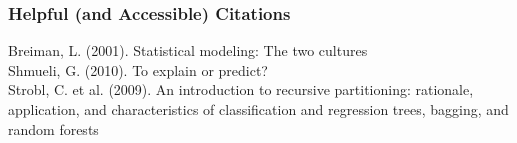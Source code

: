 \documentclass{beamer}\usepackage[]{graphicx}\usepackage[]{color}
\begin{document}

\begin{frame}
\frametitle{Helpful (and Accessible) Citations}

Breiman, L. (2001). Statistical modeling: The two cultures \\

Shmueli, G. (2010). To explain or predict? \\

Strobl, C. et al. (2009). An introduction to recursive partitioning: rationale, application, and characteristics of classification and regression trees, bagging, and random forests

\end{frame}

\end{document}
